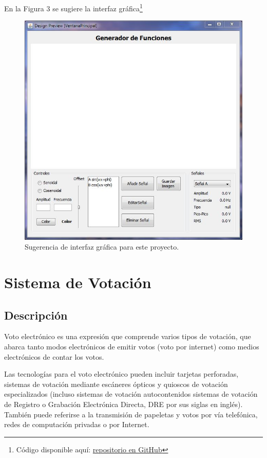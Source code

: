 \documentclass[11pt,a4paper]{article}
\begin{document}
En la Figura 3 se sugiere la interfaz gráfica\footnote{Código disponible aquí: \href{https://github.com/eduardoschz/LaTex/tree/master/Cursos\%202018-2/GUI/GUI_Proyecto_Generador}{repositorio en GitHub}  }


\begin{figure}[h]
\centering
\includegraphics[scale=0.5]{pics/img_1.JPG} 
\caption{Sugerencia de interfaz gráfica para este proyecto.}
\end{figure}



\section{Sistema de Votación}
\subsection{Descripción}
Voto electrónico es una expresión que comprende varios tipos de votación, que abarca tanto modos electrónicos de emitir votos (voto por internet) como medios electrónicos de contar los votos.

Las tecnologías para el voto electrónico pueden incluir tarjetas perforadas, sistemas de votación mediante escáneres ópticos y quioscos de votación especializados (incluso sistemas de votación autocontenidos sistemas de votación de Registro o Grabación Electrónica Directa, DRE por sus siglas en inglés). También puede referirse a la transmisión de papeletas y votos por vía telefónica, redes de computación privadas o por Internet.
\end{document}
